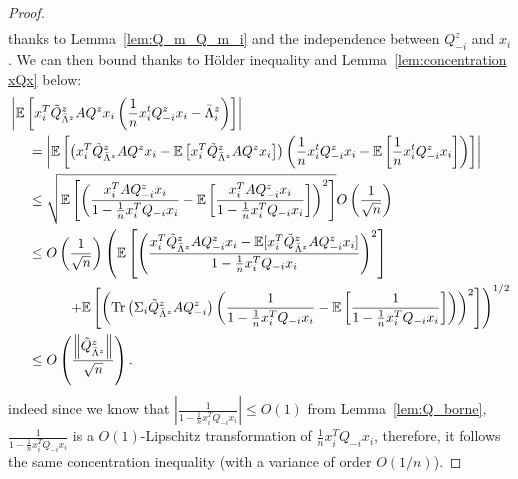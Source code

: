 \documentclass{ws-rmta}
\DeclareMathOperator{\tr}{Tr}
\begin{document}
\begin{proof}
\begin{align*}
  \end{align*}
  thanks to Lemma~\ref{lem:Q_m_Q_m_i} and the independence between $Q_{-i}^z$ and $x_i$.
  We can then bound thanks to H\"older inequality and Lemma~\ref{lem:concentration xQx} below:
  \begin{align*}
    &\left\vert \mathbb E \left[ x_i^T\tilde Q^z_{\bar \Lambda^z}A Q^zx_i \left( \frac{1}{n }x_i^t Q_{-i}^z x_i - \bar \Lambda^z_i \right) \right] \right\vert\\
    &\hspace{0.5cm}=\left\vert \mathbb E \left[ \left( x_i^T\tilde Q^z_{\bar \Lambda^z}A Q^zx_i - \mathbb E \left[ x_i^T\tilde Q^z_{\bar \Lambda^z}A Q^zx_i \right] \right) \left( \frac{1}{n }x_i^t Q_{-i}^z x_i - \mathbb E \left[ \frac{1}{n }x_i^t Q_{-i}^z x_i \right] \right) \right] \right\vert\\
  &\hspace{0.5cm}\leq \sqrt{\mathbb E \left[ \left(\frac{x_i^T AQ^z_{-i}x_i}{1 - \frac{1}{n} x_i^TQ_{-i}x_i} - \mathbb E \left[ \frac{x_i^T AQ^z_{-i}x_i}{1 - \frac{1}{n} x_i^TQ_{-i}x_i} \right] \right)^2 \right]}O \left( \frac{1}{\sqrt n}  \right)\\
  &\hspace{0.5cm}\leq O \left( \frac{1}{\sqrt n}  \right)\left(\mathbb E \left[ \left(\frac{x_i^T \tilde Q^z_{\bar \Lambda^z}AQ^z_{-i}x_i - \mathbb E[x_i^T \tilde Q^z_{\bar \Lambda^z}AQ^z_{-i}x_i]}{1 - \frac{1}{n} x_i^TQ_{-i}x_i} \right)^2 \right] \right.\\
  &\hspace{1.5cm}\left.+ \mathbb E \left[ \left(\tr\left(\Sigma_i \tilde Q^z_{\bar \Lambda^z}AQ^z_{-i}\right) \left( \frac{1}{1 - \frac{1}{n} x_i^TQ_{-i}x_i} - \mathbb E \left[ \frac{1}{1 - \frac{1}{n} x_i^TQ_{-i}x_i} \right] \right) \right)^2 \right]\right)^{1/2}\\
  &\hspace{0.5cm}\leq O \left( \frac{\left\Vert \tilde Q^z_{\bar \Lambda^z} \right\Vert}{\sqrt n}  \right).
  \end{align*}
  indeed since we know that $|\frac{1}{1 - \frac{1}{n} x_i^TQ_{-i}x_i} | \leq O(1)$ from Lemma~\ref{lem:Q_borne}, $\frac{1}{1 - \frac{1}{n} x_i^TQ_{-i}x_i}$ is a $O(1)$-Lipschitz transformation of $\frac{1}{n} x_i^TQ_{-i}x_i$, therefore, it follows the same concentration inequality (with a variance of order $O(1/ n)$).

\end{proof}
\end{document}

